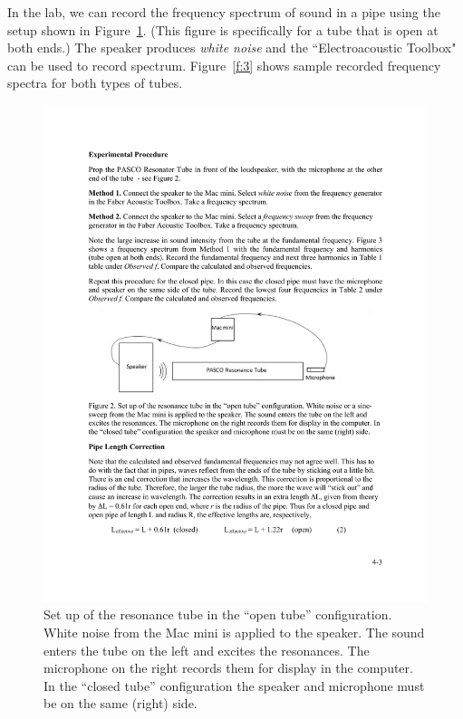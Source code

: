 \documentclass[11pt]{NSF}
\begin{document}
In the lab, we can record the frequency spectrum of sound in a pipe
using the setup shown in Figure~\ref{f:2}.
(This figure is specifically for a tube that is open at both ends.)
The speaker produces {\em white noise} and the ``Electroacoustic Toolbox"
can be used to record spectrum.
Figure~\ref{f:3} shows sample recorded frequency spectra for both 
types of tubes.
%
\begin{figure}[hbtp]
\begin{center}
\includegraphics[width=.65\textwidth]{fig4_2}
\caption{Set up of the resonance tube in the ``open tube” configuration. White
noise from the Mac mini is applied to the speaker. The sound
enters the tube on the left and excites the resonances. The microphone on the
right records them for display in the computer. In the ``closed tube” 
configuration the speaker and microphone must be on the same (right) side.}
\label{f:2} 
\end{center} 
\end{figure}
%
%
\end{document}
